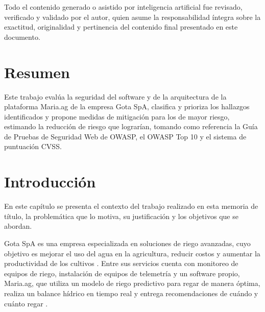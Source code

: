 \documentclass[12pt,letterpaper]{report}
\begin{document}
Todo el contenido generado o asistido por inteligencia artificial fue revisado, verificado y validado por el autor, quien asume la responsabilidad íntegra sobre la exactitud, originalidad y pertinencia del contenido final presentado en este documento.

\newpage

\renewcommand{\contentsname}{Índice}
\tableofcontents

\newpage


\chapter*{Resumen}

Este trabajo evalúa la seguridad del software y de la arquitectura de la
plataforma Maria.ag de la empresa Gota SpA, clasifica y prioriza los hallazgos
identificados y propone medidas de mitigación para los de mayor riesgo,
estimando la reducción de riesgo que lograrían, tomando como referencia la
Guía de Pruebas de Seguridad Web de OWASP, el OWASP Top 10 y el sistema de
puntuación CVSS.

\newpage

\chapter*{Introducción}

En este capítulo se presenta el contexto del trabajo realizado en esta memoria
de título, la problemática que lo motiva, su justificación y los objetivos que
se abordan.

Gota SpA es una empresa especializada en soluciones de riego avanzadas, cuyo
objetivo es mejorar el uso del agua en la agricultura, reducir costos y
aumentar la productividad de los cultivos \autocite{gota}. Entre sus servicios
cuenta con monitoreo de equipos de riego, instalación de equipos de telemetría
y un software propio, Maria.ag, que utiliza un modelo de riego predictivo para
regar de manera óptima, realiza un balance hídrico en tiempo real y entrega
recomendaciones de cuándo y cuánto regar \autocite{gota,gota2024maria}.
\end{document}
